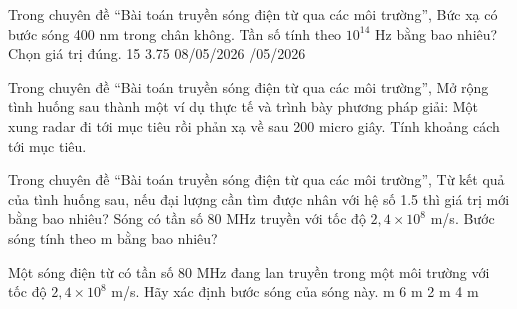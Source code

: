 \begin{ex}
Trong chuyên đề “Bài toán truyền sóng điện từ qua các môi trường”, Bức xạ có bước sóng 400 nm trong chân không. Tần số tính theo $10^{14}$ Hz bằng bao nhiêu? Chọn giá trị đúng.
\choice
{15}
{3.75}
{08/05/2026}
{/05/2026}
\end{ex}

\begin{ex}
Trong chuyên đề “Bài toán truyền sóng điện từ qua các môi trường”, Mở rộng tình huống sau thành một ví dụ thực tế và trình bày phương pháp giải: Một xung radar đi tới mục tiêu rồi phản xạ về sau 200 micro giây. Tính khoảng cách tới mục tiêu.
\choiceTF

\end{ex}

\begin{ex}
Trong chuyên đề “Bài toán truyền sóng điện từ qua các môi trường”, Từ kết quả của tình huống sau, nếu đại lượng cần tìm được nhân với hệ số 1.5 thì giá trị mới bằng bao nhiêu? Sóng có tần số 80 MHz truyền với tốc độ $2,4\times10^8$ m/s. Bước sóng tính theo m bằng bao nhiêu?
\end{ex}

\begin{ex}Một sóng điện từ có tần số $80$ MHz đang lan truyền trong một môi trường với tốc độ $2,4 \times 10^8$ m/s. Hãy xác định bước sóng của sóng này.
\choice
{ m}
{6 m}
{2 m}
{4 m}
\end{ex}

